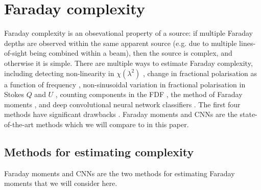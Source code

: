 \section{Faraday complexity}

    Faraday complexity is an obsevational property of a source: if multiple Faraday depths are observed within the same apparent source (e.g. due to multiple lines-of-sight being combined within a beam), then the source is complex, and otherwise it is simple. There are multiple ways to estimate Faraday complexity, including detecting non-linearity in $\chi(\lambda^2)$ \citep{goldstein84faraday}, change in fractional polarisation as a function of frequency \citep{farnes14broadband}, non-sinusoidal variation in fractional polarisation in Stokes $Q$ and $U$ \citep{osullivan12agn}, counting components in the FDF \citep{law11faraday}, the method of Faraday moments \citep{anderson_broadband_2015,Brown11report}, and deep convolutional neural network classifiers \citep[CNNs;][]{brown_classifying_2018}. The first four methods have significant drawbacks \citep[see][]{anderson_broadband_2015}. Faraday moments and CNNs are the state-of-the-art methods which we will compare to in this paper.

    \subsection{Methods for estimating complexity}
    \label{sec:existing-methods}

        Faraday moments \citep{Brown11report,anderson_broadband_2015} and CNNs \citep{brown_classifying_2018} are the two methods for estimating Faraday moments that we will consider here.

